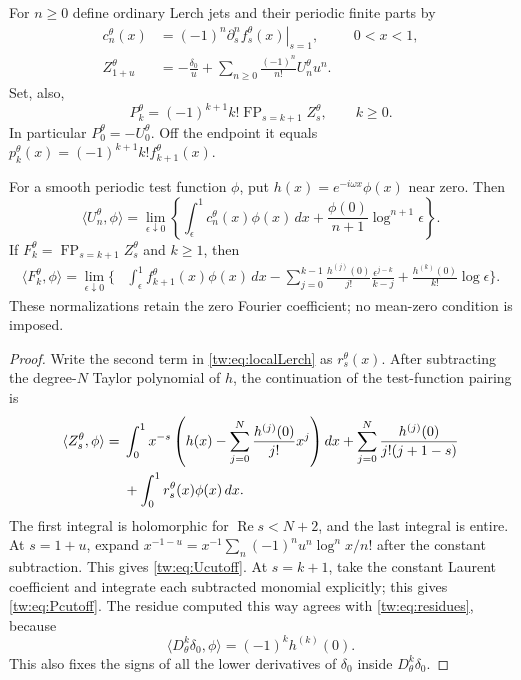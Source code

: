For $n\ge0$ define ordinary Lerch jets and their periodic finite parts
by
\begin{align}
 c_n^\theta(x)&=(-1)^n
          \left.\partial_s^n f_s^\theta(x)\right|_{s=1},
               &&0<x<1,\label{tw:eq:ordinaryjets}\\
 Z_{1+u}^\theta&=-\frac{\delta_0}{u}
       +\sum_{n\ge0}\frac{(-1)^n}{n!}U_n^\theta u^n.
 \label{tw:eq:jets}
\end{align}
Set, also,
\begin{equation}\label{tw:eq:Pk}
 P_k^\theta=(-1)^{k+1}k!
               \operatorname{FP}_{s=k+1}Z_s^\theta,
 \qquad k\ge0.
\end{equation}
In particular $P_0^\theta=-U_0^\theta$. Off the endpoint it equals
$p_k^\theta(x)=(-1)^{k+1}k! f_{k+1}^\theta(x)$.

\begin{proposition}
\label{tw:prop:cutoff}
For a smooth periodic test function $\phi$, put
$h(x)=e^{-i\omega x}\phi(x)$ near zero. Then
\begin{equation}\label{tw:eq:Ucutoff}
 \langle U_n^\theta,\phi\rangle
 =\lim_{\epsilon\downarrow0}\left\{
      \int_\epsilon^1 c_n^\theta(x)\phi(x)\,dx
        +\frac{\phi(0)}{n+1}\log^{n+1}\epsilon\right\}.
\end{equation}
If $F_k^\theta=\operatorname{FP}_{s=k+1}Z_s^\theta$ and $k\ge1$,
then
\begin{align}
 \langle F_k^\theta,\phi\rangle
 =\lim_{\epsilon\downarrow0}\biggl\{&
       \int_\epsilon^1 f_{k+1}^\theta(x)\phi(x)\,dx
       -\sum_{j=0}^{k-1}\frac{h^{(j)}(0)}{j!}
                         \frac{\epsilon^{j-k}}{k-j}
       +\frac{h^{(k)}(0)}{k!}\log\epsilon\biggr\}.
 \label{tw:eq:Pcutoff}
\end{align}
These normalizations retain the zero Fourier coefficient; no
mean-zero condition is imposed.
\end{proposition}

\begin{proof}
Write the second term in \eqref{tw:eq:localLerch} as
$r_s^\theta(x)$. After subtracting the degree-$N$ Taylor polynomial
of $h$, the continuation of the test-function pairing is
\begin{align}
 \langle Z_s^\theta,\phi\rangle={}&
 \int_0^1x^{-s}\left(h(x)-\sum_{j=0}^N
                     \frac{h^{(j)}(0)}{j!}x^j\right)dx
 +\sum_{j=0}^N\frac{h^{(j)}(0)}{j!(j+1-s)}\notag\\
 &+\int_0^1r_s^\theta(x)\phi(x)\,dx.
 \label{tw:eq:testsubtraction}
\end{align}
The first integral is holomorphic for $\operatorname{Re}s<N+2$,
and the last integral is entire. At $s=1+u$, expand
$x^{-1-u}=x^{-1}\sum_n(-1)^n u^n\log^n x/n!$ after the constant
subtraction. This gives \eqref{tw:eq:Ucutoff}. At $s=k+1$, take
the constant Laurent coefficient and integrate each subtracted
monomial explicitly; this gives \eqref{tw:eq:Pcutoff}.
The residue computed this way agrees with \eqref{tw:eq:residues},
because
\[
 \langle D_\theta^k\delta_0,\phi\rangle
       =(-1)^k h^{(k)}(0).
\]
This also fixes the signs of all the lower derivatives of $\delta_0$
inside $D_\theta^k\delta_0$.
\end{proof}

